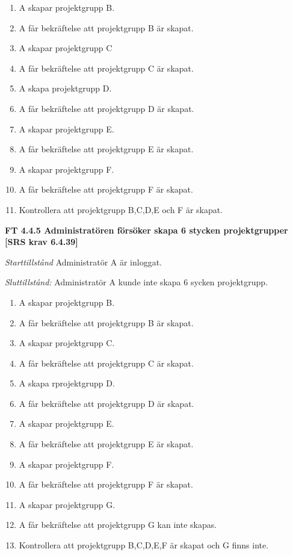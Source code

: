 \documentclass[a4paper]{article}
\begin{document}
\begin{enumerate}
\item A skapar projektgrupp B.
\item A får bekräftelse att projektgrupp B är skapat.
\item A skapar projektgrupp C
\item A får bekräftelse att projektgrupp C är skapat.
\item A skapa projektgrupp D.
\item A får bekräftelse att projektgrupp D är skapat.
\item A skapar projektgrupp E.
\item A får bekräftelse att projektgrupp E är skapat.
\item A skapar projektgrupp F.
\item A får bekräftelse att projektgrupp F är skapat.
\item Kontrollera att projektgrupp B,C,D,E och F är skapat.
\end{enumerate}

\textbf{FT 4.4.5 Administratören försöker skapa 6 stycken projektgrupper [SRS krav 6.4.39]}

\emph{Starttillstånd} Administratör A är inloggat.

\emph{Sluttillstånd:} Administratör A kunde inte skapa 6 sycken  projektgrupp.

\begin{enumerate}
\item A skapar projektgrupp B.
\item A får bekräftelse att projektgrupp B är skapat.
\item A skapar projektgrupp C.
\item A får bekräftelse att projektgrupp C är skapat.
\item A skapa rprojektgrupp D.
\item A får bekräftelse att projektgrupp D är skapat.
\item A skapar projektgrupp E.
\item A får bekräftelse att projektgrupp E är skapat.
\item A skapar projektgrupp F.
\item A får bekräftelse att projektgrupp F är skapat.
\item A skapar projektgrupp G.
\item A får bekräftelse att projektgrupp G kan inte skapas.
\item Kontrollera att projektgrupp B,C,D,E,F är skapat och G finns inte.
\end{enumerate}
\end{document}
